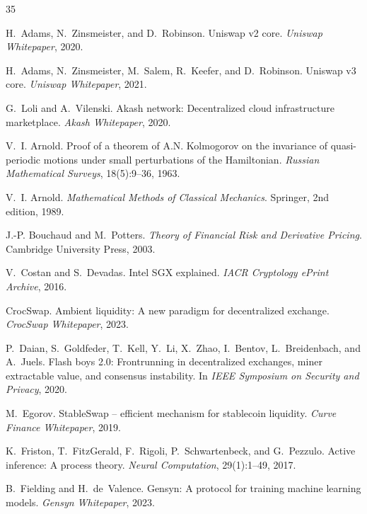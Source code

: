 \documentclass[11pt,twocolumn]{article}
\begin{document}

\begin{thebibliography}{35}

H.~Adams, N.~Zinsmeister, and D.~Robinson.
\newblock Uniswap v2 core.
\newblock \emph{Uniswap Whitepaper}, 2020.

H.~Adams, N.~Zinsmeister, M.~Salem, R.~Keefer, and D.~Robinson.
\newblock Uniswap v3 core.
\newblock \emph{Uniswap Whitepaper}, 2021.

G.~Loli and A.~Vilenski.
\newblock Akash network: Decentralized cloud infrastructure marketplace.
\newblock \emph{Akash Whitepaper}, 2020.

V.~I. Arnold.
\newblock Proof of a theorem of {A.N. Kolmogorov} on the invariance of quasi-periodic motions under small perturbations of the {Hamiltonian}.
\newblock \emph{Russian Mathematical Surveys}, 18(5):9--36, 1963.

V.~I. Arnold.
\newblock \emph{Mathematical Methods of Classical Mechanics}.
\newblock Springer, 2nd edition, 1989.

J.-P. Bouchaud and M.~Potters.
\newblock \emph{Theory of Financial Risk and Derivative Pricing}.
\newblock Cambridge University Press, 2003.

V.~Costan and S.~Devadas.
\newblock Intel {SGX} explained.
\newblock \emph{IACR Cryptology ePrint Archive}, 2016.

CrocSwap.
\newblock Ambient liquidity: A new paradigm for decentralized exchange.
\newblock \emph{CrocSwap Whitepaper}, 2023.

P.~Daian, S.~Goldfeder, T.~Kell, Y.~Li, X.~Zhao, I.~Bentov, L.~Breidenbach, and A.~Juels.
\newblock Flash boys 2.0: Frontrunning in decentralized exchanges, miner extractable value, and consensus instability.
\newblock In \emph{IEEE Symposium on Security and Privacy}, 2020.

M.~Egorov.
\newblock StableSwap -- efficient mechanism for stablecoin liquidity.
\newblock \emph{Curve Finance Whitepaper}, 2019.

K.~Friston, T.~FitzGerald, F.~Rigoli, P.~Schwartenbeck, and G.~Pezzulo.
\newblock Active inference: A process theory.
\newblock \emph{Neural Computation}, 29(1):1--49, 2017.

B.~Fielding and H.~de~Valence.
\newblock Gensyn: A protocol for training machine learning models.
\newblock \emph{Gensyn Whitepaper}, 2023.


\end{thebibliography}
\end{document}
